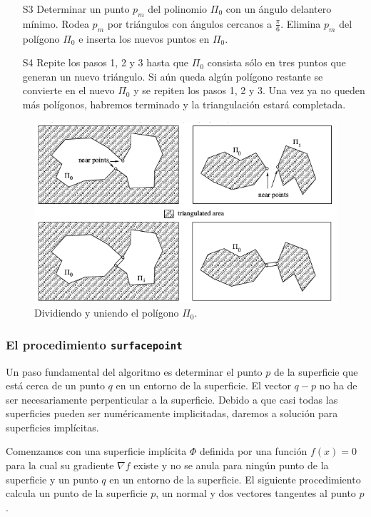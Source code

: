 \begin{enumerate}
\item[S3] Determinar un punto $p_m$ del polinomio $\Pi_0$ con un ángulo delantero mínimo. Rodea $p_m$ por triángulos con ángulos cercanos a $\frac{\pi}{6}$. Elimina $p_m$ del polígono $\Pi_0$ e inserta los nuevos puntos en $\Pi_0$.

\item[S4] Repite los pasos 1, 2 y 3 hasta que $\Pi_0$ consista sólo en tres puntos que generan un nuevo triángulo. Si aún queda algún polígono restante se convierte en el nuevo $\Pi_0$ y se repiten los pasos 1, 2 y 3. Una vez ya no queden más polígonos, habremos terminado y la triangulación estará completada.
\end{enumerate}

\begin{figure}[h]
	\centering
	\includegraphics[scale=0.5]{images/hartmann2.png}
	\caption{Dividiendo y uniendo el polígono $\Pi_0$.}
\end{figure}

\subsubsection{El procedimiento \texttt{surfacepoint}}

Un paso fundamental del algoritmo es determinar el punto $p$ de la superficie que está cerca de un punto $q$ en un entorno de la superficie. El vector $q - p$ no ha de ser necesariamente perpenticular a la superficie. Debido a que casi todas las superficies pueden ser numéricamente implicitadas, daremos a solución para superficies implícitas.

Comenzamos con una superficie implícita $\Phi$ definida por una función $f(x) = 0$ para la cual su gradiente $\nabla f$ existe y no se anula para ningún punto de la superficie y un punto $q$ en un entorno de la superficie.
El siguiente procedimiento calcula un punto de la superficie $p$, un normal y dos vectores tangentes al punto $p$.

